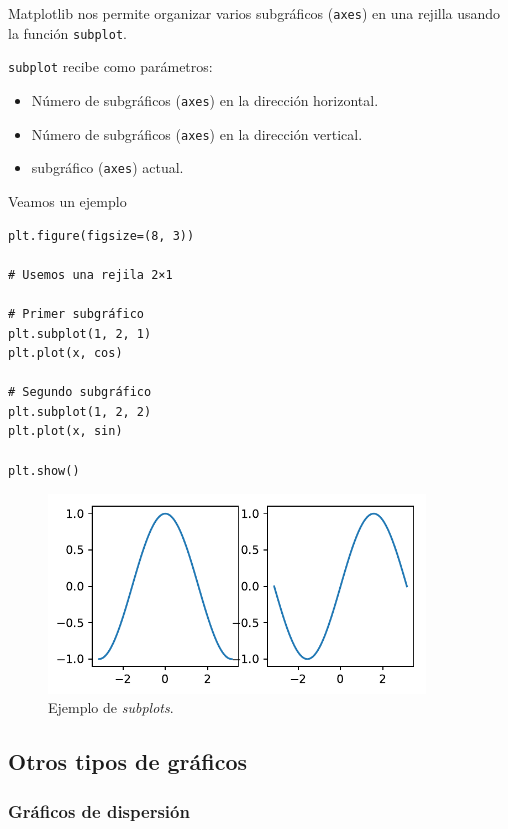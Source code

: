 Matplotlib nos permite organizar varios subgráficos (\texttt{axes}) en
una rejilla usando la función \texttt{subplot}.

\texttt{subplot} recibe como parámetros:

\begin{itemize}
\item
  Número de subgráficos (\texttt{axes}) en la dirección horizontal.
\item
  Número de subgráficos (\texttt{axes}) en la dirección vertical.
\item
  subgráfico (\texttt{axes}) actual.
\end{itemize}

Veamos un ejemplo

\begin{listing}[H]
\begin{verbatim}
plt.figure(figsize=(8, 3))

# Usemos una rejila 2×1

# Primer subgráfico
plt.subplot(1, 2, 1)
plt.plot(x, cos)

# Segundo subgráfico
plt.subplot(1, 2, 2)
plt.plot(x, sin)

plt.show()
\end{verbatim}
\end{listing}

\begin{figure}[H]
	\centering
	\includegraphics[width=10cm]{img/herramientas/subplots}
	\caption{Ejemplo de \emph{subplots}.}
	\label{fig:subplots}
\end{figure}

\subsection{Otros tipos de gráficos}

\subsubsection{Gráficos de dispersión}

